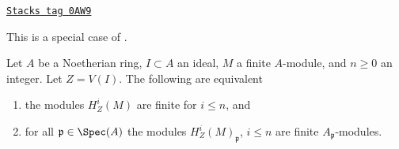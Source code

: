 \begin{lemma}
\label{local-cohomology-lemma-check-finiteness-local-cohomology-locally}
\href{https://stacks.math.columbia.edu/tag/0AW9}{\texttt{Stacks tag 0AW9}}

\begin{reference}
This is a special case of \cite[Satz 1]{Faltings-finiteness}.
\end{reference}
Let $A$ be a Noetherian ring, $I \subset A$ an ideal, $M$ a finite
$A$-module, and $n \geq 0$ an integer. Let $Z = V(I)$.
The following are equivalent
\begin{enumerate}
\item the modules $H^i_Z(M)$ are finite for $i \leq n$, and
\item for all $\mathfrak p \in \Spec(A)$ the modules
$H^i_Z(M)_\mathfrak p$, $i \leq n$ are finite $A_\mathfrak p$-modules.
\end{enumerate}
\end{lemma}

